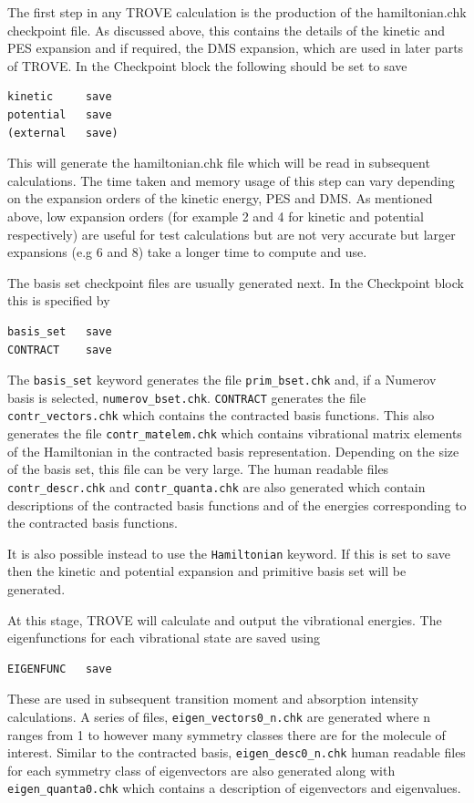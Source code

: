 The first step in any TROVE calculation is the production of the hamiltonian.chk checkpoint file. 
As discussed above, this contains the details of the kinetic and PES expansion 
and if required, the DMS expansion, which are used in later parts of TROVE. 
In the Checkpoint block the following should be set to save
\begin{verbatim}
kinetic     save
potential   save
(external   save)
\end{verbatim}
This will generate the hamiltonian.chk file which will be read in subsequent calculations. 
The time taken and memory usage of this step can vary
depending on the expansion orders of the kinetic energy, PES and DMS. 
As mentioned above, low expansion orders (for example 2 and 4 for kinetic and potential respectively) 
are useful for test calculations but are not very accurate but larger expansions (e.g 6 and 8) 
take a longer time to compute and use. 

The basis set checkpoint files are usually generated next. In the Checkpoint block this is specified by
\begin{verbatim}
basis_set   save
CONTRACT    save
\end{verbatim}
The \verb|basis_set| keyword generates the file \verb|prim_bset.chk| and, if a Numerov basis is selected,
 \verb|numerov_bset.chk|. 
\verb|CONTRACT| generates the file \verb|contr_vectors.chk| which contains the contracted basis functions. 
This also generates the file \verb|contr_matelem.chk| which contains 
vibrational matrix elements of the Hamiltonian in the contracted basis representation.
 Depending on the size of the basis set, this file can be very large.
The human readable files \verb|contr_descr.chk| and \verb|contr_quanta.chk| are also generated which contain descriptions of
the contracted basis functions and of the energies corresponding to the contracted basis functions.

It is also possible instead to use the \verb|Hamiltonian| keyword. If this is set to save then the kinetic and potential expansion and primitive basis set will be generated.

At this stage, TROVE will calculate and output the vibrational energies. The eigenfunctions for each vibrational state are saved using
\begin{verbatim}
EIGENFUNC   save
\end{verbatim}
These are used in subsequent transition moment and absorption intensity calculations.
 A series of files, \verb|eigen_vectors0_n.chk| are generated where n ranges from 1 to however
many symmetry classes there are for the molecule of interest.
 Similar to the contracted basis, \verb|eigen_desc0_n.chk| human readable files for each symmetry class of 
eigenvectors are also generated along with \verb|eigen_quanta0.chk| which contains a description of eigenvectors and eigenvalues.


